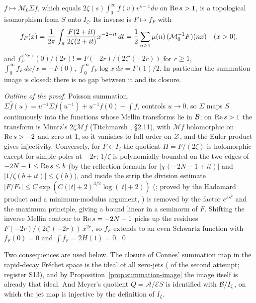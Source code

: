\begin{proposition}\label{prop:summation-image}
$f\mapsto\mathcal{M}_0\Sigma f$, which equals $2\zeta(s)\int_0^\infty f(v)v^{s-1}dv$ on $\operatorname{Re} s>1$, is a topological isomorphism from $S$ onto $I_\zeta$. Its inverse is $F\mapsto f_F$ with
\[
f_F(x)=\frac1{2\pi}\int_{\mathbb{R}}\frac{F(2+it)}{2\zeta(2+it)}x^{-2-it}\,dt=\frac12\sum_{n\ge1}\mu(n)\,(\mathcal{M}_0^{-1}F)(nx)\quad(x>0),
\]
and $f_F^{(2r)}(0)/(2r)!=F(-2r)/(2\zeta'(-2r))$ for $r\ge1$, $\int_0^\infty f_F\,dx/x=-F(0)$, $\int_0^\infty f_F\log x\,dx=F(1)/2$.
In particular the summation image is closed: there is no gap between it and its closure.
\end{proposition}

\emph{Outline of the proof.}
Poisson summation, $\Sigma\hat f(u)=u^{-1}\Sigma f(u^{-1})+u^{-1}f(0)-\int f$, controls $u\to0$, so $\Sigma$ maps $S$ continuously into the functions whose Mellin transforms lie in $\mathcal{B}$; on $\operatorname{Re} s>1$ the transform is Müntz's $2\zeta\mathcal{M}f$ (Titchmarsh \cite{Titchmarsh}, §2.11), with $\mathcal{M}f$ holomorphic on $\operatorname{Re} s>-2$ and zero at $1$, so it vanishes to full order on $\mathcal{Z}$, and the Euler product gives injectivity.
Conversely, for $F\in I_\zeta$ the quotient $H=F/(2\zeta)$ is holomorphic except for simple poles at $-2r$; $1/\zeta$ is polynomially bounded on the two edges of $-2N-1\le\operatorname{Re} s\le b$ (by the reflection formula for $|\chi(-2N-1+it)|$ and $|1/\zeta(b+it)|\le\zeta(b)$), and inside the strip the division estimate $|F/F_*|\le C\exp(C(|t|+2)^{3/2}\log(|t|+2))$ (; proved by the Hadamard product and a minimum-modulus argument, ) is removed by the factor $e^{\varepsilon s^2}$ and the maximum principle, giving a bound linear in a seminorm of $F$.
Shifting the inverse Mellin contour to $\operatorname{Re} s=-2N-1$ picks up the residues $F(-2r)/(2\zeta'(-2r))\,x^{2r}$, so $f_F$ extends to an even Schwartz function with $f_F(0)=0$ and $\int f_F=2H(1)=0$. \qed

Two consequences are used below.
The closure of Connes' summation map in the rapid-decay Fréchet space is the ideal of all zero-jets ( of the second attempt; register S13), and by Proposition~\ref{prop:summation-image} the image itself is already that ideal.
And Meyer's quotient $Q=\mathcal{A}/\mathcal{E}S$ is identified with $\mathcal{B}/I_\zeta$, on which the jet map is injective by the definition of $I_\zeta$.

